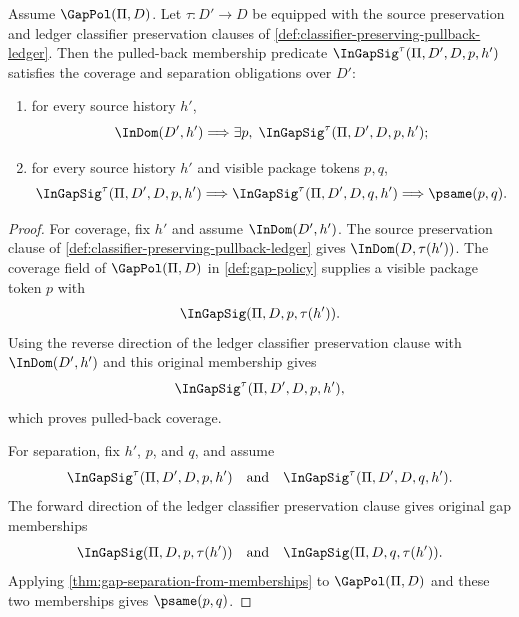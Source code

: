 \begin{theorem}
\label{thm:pulled-back-gap-policy-preserves-coverage-and-separation}
Assume $\GapPol(\Pi,D)$. Let $\tau:D'\to D$ be equipped with the source preservation and ledger classifier preservation clauses of \autoref{def:classifier-preserving-pullback-ledger}. Then the pulled-back membership predicate ${\InGapSig}^{\tau}(\Pi,D',D,p,h')$ satisfies the coverage and separation obligations over $D'$:
\begin{enumerate}
  \item for every source history $h'$,
  $$
    \InDom(D',h')\Longrightarrow\exists p,\;{\InGapSig}^{\tau}(\Pi,D',D,p,h');
  $$
  \item for every source history $h'$ and visible package tokens $p,q$,
  $$
    {\InGapSig}^{\tau}(\Pi,D',D,p,h')
    \Longrightarrow
    {\InGapSig}^{\tau}(\Pi,D',D,q,h')
    \Longrightarrow
    \psame(p,q).
  $$
\end{enumerate}
\end{theorem}

\begin{proof}
For coverage, fix $h'$ and assume $\InDom(D',h')$. The source preservation clause of \autoref{def:classifier-preserving-pullback-ledger} gives $\InDom(D,\tau(h'))$. The coverage field of $\GapPol(\Pi,D)$ in \autoref{def:gap-policy} supplies a visible package token $p$ with
$$
  \InGapSig(\Pi,D,p,\tau(h')).
$$
Using the reverse direction of the ledger classifier preservation clause with $\InDom(D',h')$ and this original membership gives
$$
  {\InGapSig}^{\tau}(\Pi,D',D,p,h'),
$$
which proves pulled-back coverage.

For separation, fix $h'$, $p$, and $q$, and assume
$$
  {\InGapSig}^{\tau}(\Pi,D',D,p,h')
  \quad\text{and}\quad
  {\InGapSig}^{\tau}(\Pi,D',D,q,h').
$$
The forward direction of the ledger classifier preservation clause gives original gap memberships
$$
  \InGapSig(\Pi,D,p,\tau(h'))
  \quad\text{and}\quad
  \InGapSig(\Pi,D,q,\tau(h')).
$$
Applying \autoref{thm:gap-separation-from-memberships} to $\GapPol(\Pi,D)$ and these two memberships gives $\psame(p,q)$.
\end{proof}

